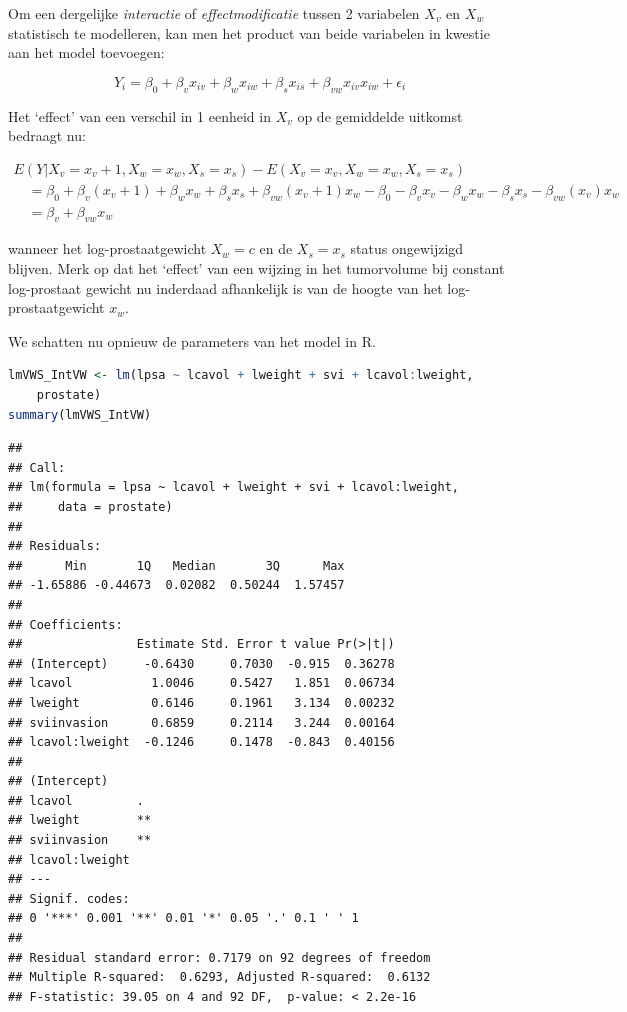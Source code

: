 \documentclass[
  12pt,dutch,coursenotes]{book}
\begin{document}
Om een dergelijke \textit{interactie} of \textit{effectmodificatie} tussen 2 variabelen \(X_v\) en \(X_w\) statistisch te modelleren, kan men het product van beide variabelen in kwestie aan het model toevoegen:

\[
Y_i = \beta_0 + \beta_v x_{iv} + \beta_w x_{iw} +\beta_s x_{is} + \beta_{vw} x_{iv}x_{iw} +\epsilon_i
\]

Het `effect' van een verschil in 1 eenheid in \(X_v\) op de gemiddelde uitkomst bedraagt nu:

\[
\begin{array}{l}
E(Y|X_v=x_v+1,X_w=x_w,X_s=x_s) − E(X_v=x_v,X_w=x_w,X_s=x_s) \\
\quad = \beta_0 + \beta_v (x_{v}+1) + \beta_w x_w +\beta_s x_{s} + \beta_{vw} (x_{v}+1) x_w - \beta_0 - \beta_v x_{v} - \beta_w x_w -\beta_s x_{s} - \beta_{vw} (x_{v}) x_w \\
\quad = \beta_v +  \beta_{vw} x_w
 \end{array}
\]

wanneer het log-prostaatgewicht \(X_w=c\) en de \(X_s=x_s\) status ongewijzigd blijven. Merk op dat het `effect' van een wijzing in het tumorvolume bij
constant log-prostaat gewicht nu inderdaad afhankelijk is van de hoogte van het log-prostaatgewicht \(x_w\).

We schatten nu opnieuw de parameters van het model in R.

\begin{lstlisting}[language=R]
lmVWS_IntVW <- lm(lpsa ~ lcavol + lweight + svi + lcavol:lweight,
    prostate)
summary(lmVWS_IntVW)
\end{lstlisting}

\begin{lstlisting}
## 
## Call:
## lm(formula = lpsa ~ lcavol + lweight + svi + lcavol:lweight, 
##     data = prostate)
## 
## Residuals:
##      Min       1Q   Median       3Q      Max 
## -1.65886 -0.44673  0.02082  0.50244  1.57457 
## 
## Coefficients:
##                Estimate Std. Error t value Pr(>|t|)
## (Intercept)     -0.6430     0.7030  -0.915  0.36278
## lcavol           1.0046     0.5427   1.851  0.06734
## lweight          0.6146     0.1961   3.134  0.00232
## sviinvasion      0.6859     0.2114   3.244  0.00164
## lcavol:lweight  -0.1246     0.1478  -0.843  0.40156
##                  
## (Intercept)      
## lcavol         . 
## lweight        **
## sviinvasion    **
## lcavol:lweight   
## ---
## Signif. codes:  
## 0 '***' 0.001 '**' 0.01 '*' 0.05 '.' 0.1 ' ' 1
## 
## Residual standard error: 0.7179 on 92 degrees of freedom
## Multiple R-squared:  0.6293, Adjusted R-squared:  0.6132 
## F-statistic: 39.05 on 4 and 92 DF,  p-value: < 2.2e-16
\end{lstlisting}
\end{document}

